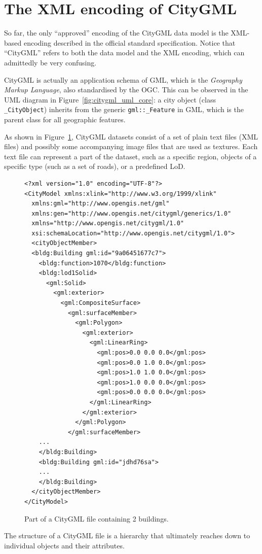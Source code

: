 \section[XML-encoded CityGML]{The XML encoding of CityGML}%
\label{sec:citygmlxml}

So far, the only ``approved'' encoding of the CityGML data model is the XML-based encoding described in the official standard specification.
Notice that ``CityGML'' refers to both the data model and the XML encoding, which can admittedly be very confusing.

%

CityGML is actually an application schema of GML, which is the \emph{Geography Markup Language}, also standardised by the OGC.
This can be observed in the UML diagram in Figure~\ref{fig:citygml_uml_core}: a city object (class \texttt{\_CityObject}) inherits from the generic \texttt{gml::\_Feature} in GML, which is the parent class for all geographic features.
  
%

As shown in Figure~\ref{fig:citygml_file}, CityGML datasets consist of a set of plain text files (XML files) and possibly some accompanying image files that are used as textures. 
Each text file can represent a part of the dataset, such as a specific region, objects of a specific type (such as a set of roads), or a predefined LoD\@.
\begin{figure}
\begin{lstlisting}
<?xml version="1.0" encoding="UTF-8"?>
<CityModel xmlns:xlink="http://www.w3.org/1999/xlink" 
  xmlns:gml="http://www.opengis.net/gml" 
  xmlns:gen="http://www.opengis.net/citygml/generics/1.0" 
  xmlns="http://www.opengis.net/citygml/1.0" 
  xsi:schemaLocation="http://www.opengis.net/citygml/1.0">
  <cityObjectMember>
  <bldg:Building gml:id="9a06451677c7">
    <bldg:function>1070</bldg:function>
    <bldg:lod1Solid>
      <gml:Solid>
        <gml:exterior>
          <gml:CompositeSurface>
            <gml:surfaceMember>
              <gml:Polygon>
                <gml:exterior>
                  <gml:LinearRing>
                    <gml:pos>0.0 0.0 0.0</gml:pos>
                    <gml:pos>0.0 1.0 0.0</gml:pos>
                    <gml:pos>1.0 1.0 0.0</gml:pos>
                    <gml:pos>1.0 0.0 0.0</gml:pos>
                    <gml:pos>0.0 0.0 0.0</gml:pos>
                  </gml:LinearRing>
                </gml:exterior>
              </gml:Polygon>
            </gml:surfaceMember>
    ...
    </bldg:Building>
    <bldg:Building gml:id="jdhd76sa">
    ...
    </bldg:Building>
  </cityObjectMember>
</CityModel>
\end{lstlisting}
\caption{Part of a CityGML file containing 2 buildings.}%
\label{fig:citygml_file}
\end{figure}
The structure of a CityGML file is a hierarchy that ultimately reaches down to individual objects and their attributes. 

